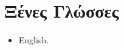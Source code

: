 \documentclass[%
    11pt,
  oneside
  ]{memoir}
\let\oldsection\section
\renewcommand{\section}[1]{%
  \oldsection{#1}
  \leavevmode
  \par
  \vspace{\dimexpr-\baselineskip-\parskip}
}
\begin{document}
\hypertarget{ux3beux3adux3bdux3b5ux3c2-ux3b3ux3bbux3ceux3c3ux3c3ux3b5ux3c2}{%
\section{Ξένες
Γλώσσες}\label{ux3beux3adux3bdux3b5ux3c2-ux3b3ux3bbux3ceux3c3ux3c3ux3b5ux3c2}}

\begin{itemize}
\tightlist
\item
  English.
\end{itemize}
\end{document}
